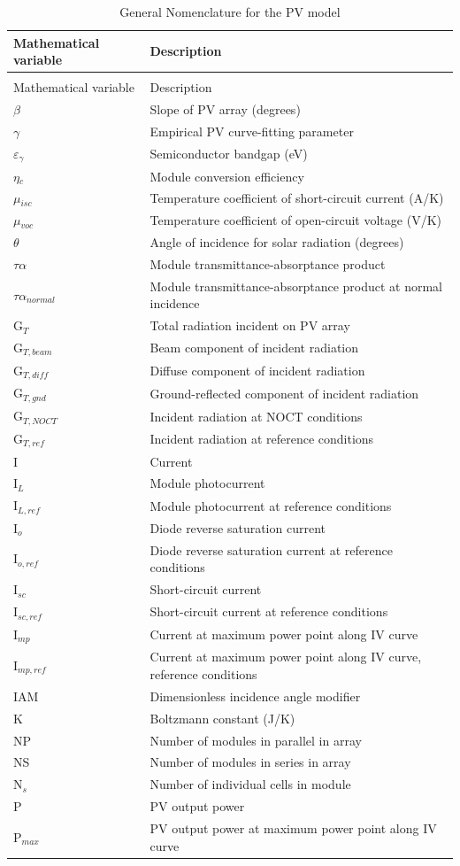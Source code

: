 \begin{longtable}[l]{p{1.2in}p{4.8in}}
\caption{General Nomenclature for the PV model \label{table:general-nomenclature-for-the-pv-model}} \tabularnewline
\toprule 
Mathematical variable & Description \tabularnewline
\midrule
\endfirsthead

\caption[]{General Nomenclature for the PV model} \tabularnewline
\toprule 
Mathematical variable & Description \tabularnewline
\midrule
\endhead

$\beta$ & Slope of PV array (degrees) \tabularnewline
$\gamma$ & Empirical PV curve-fitting parameter \tabularnewline
$\varepsilon$\(_{\gamma}\) & Semiconductor bandgap (eV) \tabularnewline
$\eta$\(_{c}\) & Module conversion efficiency \tabularnewline
$\mu$\(_{isc}\) & Temperature coefficient of short-circuit current (A/K) \tabularnewline
$\mu$\(_{voc}\) & Temperature coefficient of open-circuit voltage (V/K) \tabularnewline
$\theta$ & Angle of incidence for solar radiation (degrees) \tabularnewline
$\tau\alpha$ & Module transmittance-absorptance product \tabularnewline
$\tau\alpha$\(_{normal}\) & Module transmittance-absorptance product at normal incidence \tabularnewline
G\(_{T}\) & Total radiation incident on PV array \tabularnewline
G\(_{T,beam}\) & Beam component of incident radiation \tabularnewline
G\(_{T,diff}\) & Diffuse component of incident radiation \tabularnewline
G\(_{T,gnd}\) & Ground-reflected component of incident radiation \tabularnewline
G\(_{T,NOCT}\) & Incident radiation at NOCT conditions \tabularnewline
G\(_{T,ref}\) & Incident radiation at reference conditions \tabularnewline
I & Current \tabularnewline
I\(_{L}\) & Module photocurrent \tabularnewline
I\(_{L,ref}\) & Module photocurrent at reference conditions \tabularnewline
I\(_{o}\) & Diode reverse saturation current \tabularnewline
I\(_{o,ref}\) & Diode reverse saturation current at reference conditions \tabularnewline
I\(_{sc}\) & Short-circuit current \tabularnewline
I\(_{sc,ref}\) & Short-circuit current at reference conditions \tabularnewline
I\(_{mp}\) & Current at maximum power point along IV curve \tabularnewline
I\(_{mp,ref}\) & Current at maximum power point along IV curve, reference conditions \tabularnewline
IAM & Dimensionless incidence angle modifier \tabularnewline
K & Boltzmann constant (J/K) \tabularnewline
NP & Number of modules in parallel in array \tabularnewline
NS & Number of modules in series in array \tabularnewline
N\(_{s}\) & Number of individual cells in module \tabularnewline
P & PV output power \tabularnewline
P\(_{max}\) & PV output power at maximum power point along IV curve \tabularnewline

\end{longtable}
